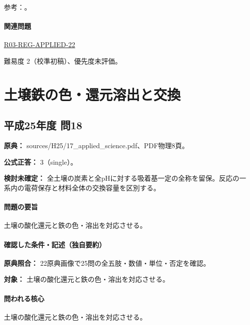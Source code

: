 \par 参考：\cite{hom_quartz,hom_biotite,hom_forsterite,hom_augite}。

\paragraph{関連問題} \hyperref[q:r03-reg-applied-22]{R03-REG-APPLIED-22}

\par 難易度 2（校準初稿）、優先度未評価。

\section{土壌鉄の色・還元溶出と交換}

\subsection{平成25年度 問18}
\label{q:h25-reg-applied-18}

\noindent\textbf{原典：} sources/H25/17\_applied\_science.pdf、PDF物理8頁。

\textbf{公式正答：} 3（single）。

\par\textbf{検討未確定：} 全土壌の炭素と全pHに対する吸着基一定の全称を留保。反応の一系内の電荷保存と材料全体の交換容量を区別する。

\paragraph{問題の要旨} 土壌の酸化還元と鉄の色・溶出を対応させる。

\paragraph{確認した条件・記述（独自要約）}\mbox{}\par

\noindent\textbf{原典照合：} 22原典画像で25問の全五肢・数値・単位・否定を確認。\par

\noindent\textbf{対象：} 土壌の酸化還元と鉄の色・溶出を対応させる。\par

\paragraph{問われる核心} 土壌の酸化還元と鉄の色・溶出を対応させる。


